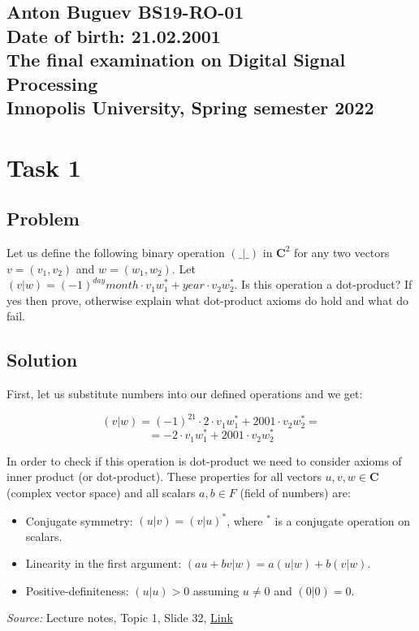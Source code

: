 \documentclass{article}
\begin{document}

\begin{center}
    \section*{Anton Buguev BS19-RO-01\\
    Date of birth: 21.02.2001\\
    The final examination on Digital Signal Processing\\
    Innopolis University, Spring semester 2022}
\end{center}

\section{Task 1}
\subsection{Problem}

Let us define the following binary operation $(\_|\_)$ in $\pmb{C}^2$ for any two vectors $v=(v_1,v_2)$ and $w=(w_1,w_2)$. Let $(v|w)=(-1)^{day}month\cdot v_1w_1^*+year\cdot v_2w_2^*$. Is this operation a dot-product? If yes then prove, otherwise explain what dot-product axioms do hold and what do fail.

\subsection{Solution}

First, let us substitute numbers into our defined operations and we get:

$$(v|w)=(-1)^{21}\cdot2\cdot v_1w_1^*+2001\cdot v_2w_2^*=$$
$$=-2\cdot v_1w_1^*+2001\cdot v_2w_2^*$$

In order to check if this operation is dot-product we need to consider axioms of inner product (or dot-product). These properties for all vectors $u,v,w \in \pmb{C}$ (complex vector space) and all scalars $a,b\in F$ (field of numbers) are:

\begin{itemize}
    \item Conjugate symmetry: $(u|v) = (v|u)^*$, where $^*$ is a conjugate
operation on scalars.
    \item Linearity in the first argument: $(au+bv|w) = a(u|w)+b(v|w)$.
    \item Positive-definiteness: $(u|u) > 0$ assuming $u\neq 0$ and $(0|0) = 0$.
\end{itemize}
\emph{Source:} Lecture notes, Topic 1, Slide 32,
\href{https://moodle.innopolis.university/pluginfile.php/142527/mod_resource/content/1/DSPt1spr22.pdf}{Link}\\
\end{document}
